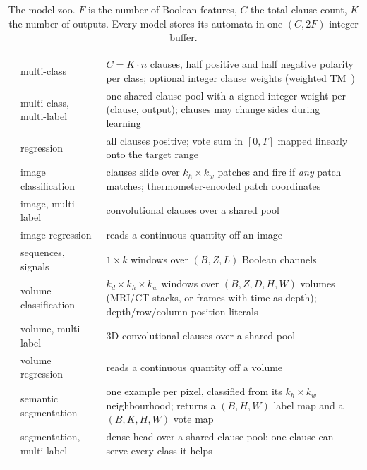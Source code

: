 \begin{table}[htbp]
\centering
\small\sffamily\sloppy
\caption{The model zoo. $F$ is the number of Boolean features, $C$ the total clause count,
  $K$ the number of outputs. Every model stores its automata in one
  $(C, 2F)$ integer buffer.}
\label{tab:models}
\begin{tabularx}{\linewidth}{@{}L{5.55cm}L{2.45cm}>{\raggedright\arraybackslash}X@{}}
\ttoprule
{} &  & \\
\ttmidrule
{} & multi-class &
  $C = K\cdot n$ clauses, half positive and half negative polarity per class; optional
  integer clause weights (weighted TM~)\\
 & multi-class, multi-label &
  one shared clause pool with a signed integer weight per (clause, output); clauses may
  change sides during learning~\\
 & regression &
  all clauses positive; vote sum in $[0,T]$ mapped linearly onto the target range~\\
 & image classification &
  clauses slide over $k_h\times k_w$ patches and fire if \emph{any} patch matches;
  thermometer-encoded patch coordinates~\\
 & image, multi-label &
  convolutional clauses over a shared pool\\
 & image regression &
  reads a continuous quantity off an image~\\
 & sequences, signals &
  $1\times k$ windows over $(B, Z, L)$ Boolean channels\\
\ttmidrule
{} & volume classification &
  $k_d\times k_h\times k_w$ windows over $(B, Z, D, H, W)$ volumes (MRI\slash CT stacks, or
  frames with time as depth); depth\slash row\slash column position literals\\
 & volume, multi-label &
  3D convolutional clauses over a shared pool\\
 & volume regression &
  reads a continuous quantity off a volume\\
\ttmidrule
{} & semantic segmentation &
  one example per pixel, classified from its $k_h\times k_w$ neighbourhood; returns a
  $(B,H,W)$ label map and a $(B,K,H,W)$ vote map\\
 & segmentation, multi-label &
  dense head over a shared clause pool; one clause can serve every class it helps\\
\ttbotrule
\end{tabularx}
\end{table}

